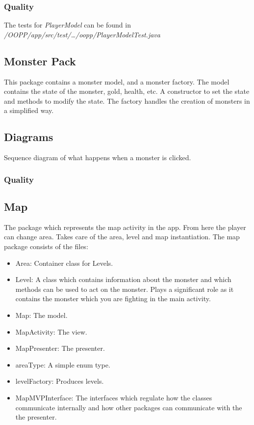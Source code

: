 \documentclass{article}
\begin{document}
\subsubsection{Quality}
The tests for \emph{PlayerModel} can be found in \emph{/OOPP/app/src/test/\ldots/oopp/PlayerModelTest.java}

\subsection{Monster Pack}
This package contains a monster model, and a monster factory. The model contains the state of the monster, gold, health, etc. A constructor to set the state and methods
to modify the state. The factory handles the creation of monsters in a simplified way.

\subsection{Diagrams}
\begin{center}
    Sequence diagram of what happens when a monster is clicked.\\
\end{center}

\subsubsection{Quality}

\subsection{Map}
The package which represents the map activity in the app. From here the player can change area. Takes care of the area, level and map instantiation.
The map package consists of the files:
\begin{itemize}
    \item Area: Container class for Levels.
    \item Level: A class which contains information about the monster and which methods can be used to act on the monster. Plays a significant role as it contains the monster which you are fighting in the main activity.
    \item Map: The model.
    \item MapActivity: The view.
    \item MapPresenter: The presenter.
    \item areaType: A simple enum type.
    \item levelFactory: Produces levels.
    \item MapMVPInterface: The interfaces which regulate how the classes communicate internally and how other packages can communicate with the the presenter.
\end{itemize}
\end{document}
